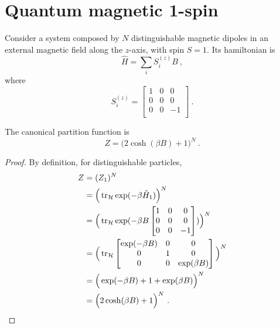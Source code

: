 \section{Quantum magnetic 1-spin}

    Consider a system composed by $N$ distinguishable magnetic dipoles in an external magnetic field along the $z$-axis, with spin $S = 1$. Its hamiltonian is 
    \begin{equation*}
        \hat H = \sum_i S^{(z)}_i B ~,
    \end{equation*}
    where
    \begin{equation*}
        S^{(z)}_i = \begin{bmatrix}
            1 & 0 & 0 \\
            0 & 0 & 0 \\
            0 & 0 & - 1 \\
        \end{bmatrix} ~.
    \end{equation*}

    The canonical partition function is 
    \begin{equation*}
        Z = \Big ( 2 \cosh (\beta B) + 1 \Big)^N ~.
    \end{equation*}
    \begin{proof}
        By definition, for distinguishable particles,
        \begin{equation*}
        \begin{aligned}
            Z & = (Z_1)^N \\ & = \Big (\operatorname{tr}_{\mathcal H} \exp(- \beta \hat H_1) \Big)^N \\ & = \Big (\operatorname{tr}_{\mathcal H} \exp(- \beta B \begin{bmatrix}
                1 & 0 & 0 \\ 0 & 0 & 0 \\ 0 & 0 & - 1 \\ 
            \end{bmatrix}) \Big)^N \\ & = \Big(\operatorname{tr}_{\mathcal H} \begin{bmatrix}
                \exp(- \beta B) & 0 & 0 \\ 0 & 1 & 0 \\ 0 & 0 & \exp(\beta B) \\ 
            \end{bmatrix} \Big )^N \\ & = \Big( \exp(- \beta B) + 1 + \exp(\beta B) \Big)^N \\ & = \Big ( 2 \cosh (\beta B) + 1 \Big)^N ~.
        \end{aligned}
        \end{equation*}
    \end{proof}

